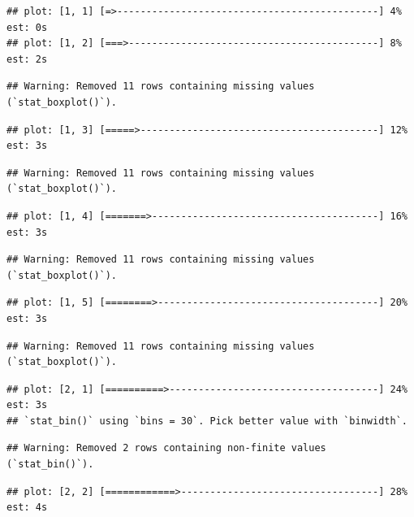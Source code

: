 \documentclass[
]{article}
\begin{document}
\begin{verbatim}
## plot: [1, 1] [=>---------------------------------------------] 4% est: 0s
## plot: [1, 2] [===>-------------------------------------------] 8% est: 2s
\end{verbatim}

\begin{verbatim}
## Warning: Removed 11 rows containing missing values (`stat_boxplot()`).
\end{verbatim}

\begin{verbatim}
## plot: [1, 3] [=====>-----------------------------------------] 12% est: 3s
\end{verbatim}

\begin{verbatim}
## Warning: Removed 11 rows containing missing values (`stat_boxplot()`).
\end{verbatim}

\begin{verbatim}
## plot: [1, 4] [=======>---------------------------------------] 16% est: 3s
\end{verbatim}

\begin{verbatim}
## Warning: Removed 11 rows containing missing values (`stat_boxplot()`).
\end{verbatim}

\begin{verbatim}
## plot: [1, 5] [========>--------------------------------------] 20% est: 3s
\end{verbatim}

\begin{verbatim}
## Warning: Removed 11 rows containing missing values (`stat_boxplot()`).
\end{verbatim}

\begin{verbatim}
## plot: [2, 1] [==========>------------------------------------] 24% est: 3s
## `stat_bin()` using `bins = 30`. Pick better value with `binwidth`.
\end{verbatim}

\begin{verbatim}
## Warning: Removed 2 rows containing non-finite values (`stat_bin()`).
\end{verbatim}

\begin{verbatim}
## plot: [2, 2] [============>----------------------------------] 28% est: 4s
\end{verbatim}
\end{document}
